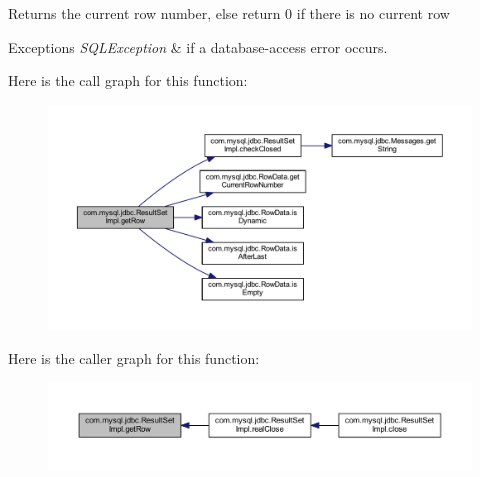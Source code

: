 \begin{DoxyReturn}{Returns}
the current row number, else return 0 if there is no current row
\end{DoxyReturn}

\begin{DoxyExceptions}{Exceptions}
{\em S\+Q\+L\+Exception} & if a database-\/access error occurs. \\
\hline
\end{DoxyExceptions}
Here is the call graph for this function\+:
\nopagebreak
\begin{figure}[H]
\begin{center}
\leavevmode
\includegraphics[width=350pt]{classcom_1_1mysql_1_1jdbc_1_1_result_set_impl_aeab5769a8f98deccc6ec77859c2c4d8f_cgraph}
\end{center}
\end{figure}
Here is the caller graph for this function\+:
\nopagebreak
\begin{figure}[H]
\begin{center}
\leavevmode
\includegraphics[width=350pt]{classcom_1_1mysql_1_1jdbc_1_1_result_set_impl_aeab5769a8f98deccc6ec77859c2c4d8f_icgraph}
\end{center}
\end{figure}
\mbox{\label{classcom_1_1mysql_1_1jdbc_1_1_result_set_impl_ab197af35d136130f30ba471848e1737d}} 
